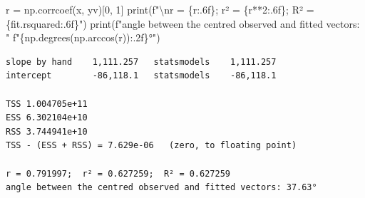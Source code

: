 \documentclass[
  letterpaper,
  10pt,
  twoside,
  openright,
  numbers=noenddot,
  chapterprefix=true]{scrbook}
\newenvironment{Shaded}{}{}
\newcommand{\BuiltInTok}[1]{\textcolor[rgb]{0.84,0.23,0.29}{#1}}
\newcommand{\CharTok}[1]{\textcolor[rgb]{0.01,0.18,0.38}{#1}}
\newcommand{\DecValTok}[1]{\textcolor[rgb]{0.00,0.36,0.77}{#1}}
\newcommand{\NormalTok}[1]{\textcolor[rgb]{0.14,0.16,0.18}{#1}}
\newcommand{\OperatorTok}[1]{\textcolor[rgb]{0.14,0.16,0.18}{#1}}
\newcommand{\SpecialCharTok}[1]{\textcolor[rgb]{0.00,0.36,0.77}{#1}}
\newcommand{\SpecialStringTok}[1]{\textcolor[rgb]{0.01,0.18,0.38}{#1}}
\begin{document}
\begin{Shaded}
\begin{Highlighting}[]
\NormalTok{r }\OperatorTok{=}\NormalTok{ np.corrcoef(x, yv)[}\DecValTok{0}\NormalTok{, }\DecValTok{1}\NormalTok{]}
\BuiltInTok{print}\NormalTok{(}\SpecialStringTok{f"}\CharTok{\textbackslash{}n}\SpecialStringTok{r = }\SpecialCharTok{\{}\NormalTok{r}\SpecialCharTok{:.6f\}}\SpecialStringTok{;  r² = }\SpecialCharTok{\{}\NormalTok{r}\OperatorTok{**}\DecValTok{2}\SpecialCharTok{:.6f\}}\SpecialStringTok{;  R² = }\SpecialCharTok{\{}\NormalTok{fit}\SpecialCharTok{.}\NormalTok{rsquared}\SpecialCharTok{:.6f\}}\SpecialStringTok{"}\NormalTok{)}
\BuiltInTok{print}\NormalTok{(}\SpecialStringTok{f"angle between the centred observed and fitted vectors: "}
      \SpecialStringTok{f"}\SpecialCharTok{\{}\NormalTok{np}\SpecialCharTok{.}\NormalTok{degrees(np.arccos(r))}\SpecialCharTok{:.2f\}}\SpecialStringTok{°"}\NormalTok{)}
\end{Highlighting}
\end{Shaded}

\begin{verbatim}
slope by hand    1,111.257   statsmodels    1,111.257
intercept        -86,118.1   statsmodels    -86,118.1

TSS 1.004705e+11
ESS 6.302104e+10
RSS 3.744941e+10
TSS - (ESS + RSS) = 7.629e-06   (zero, to floating point)

r = 0.791997;  r² = 0.627259;  R² = 0.627259
angle between the centred observed and fitted vectors: 37.63°
\end{verbatim}
\end{document}
